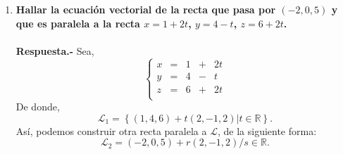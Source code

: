 \begin{enumerate}
	
    \item \textbf{\boldmath Hallar la ecuación vectorial de la recta que pasa por $(-2,0,5)$ y que es paralela a la recta $x=1+2t$, $y=4-t$, $z=6+2t$.\\\\
	Respuesta.-}\; Sea, 
	$$\left\{\begin{array}{rcrcr}
		x&=&1&+&2t\\
		y&=&4&-&t\\
		z&=&6&+&2t\\
	\end{array}\right.$$
De donde,
$$\mathscr{L}_1 = \left\{(1,4,6)+t(2,-1,2)|t\in \mathbb{R}\right\}.$$ 
Así, podemos construir otra recta paralela a $\mathscr{L}$, de la siguiente forma:
$$\mathscr{L}_2 = {(-2,0,5)+r(2,-1,2)/s\in \mathbb{R}}.$$\\\\



\end{enumerate}
